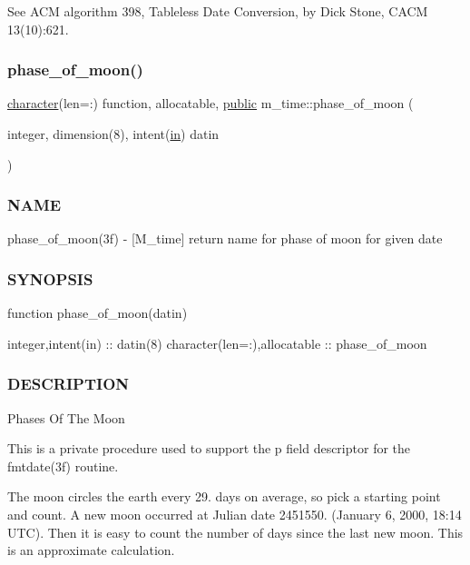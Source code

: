 \begin{DoxyVerb}
See A\+CM algorithm 398, Tableless Date Conversion, by Dick Stone, C\+A\+CM 13(10)\+:621. \mbox{\label{namespacem__time_ab8a976e2f113cc38b6df80974cee55dc}} 
\subsubsection{\texorpdfstring{phase\+\_\+of\+\_\+moon()}{phase\_of\_moon()}}
{\footnotesize\ttfamily \hyperlink{option__stopwatch_83_8txt_abd4b21fbbd175834027b5224bfe97e66}{character}(len=\+:) function, allocatable, \hyperlink{M__stopwatch_83_8txt_a2f74811300c361e53b430611a7d1769f}{public} m\+\_\+time\+::phase\+\_\+of\+\_\+moon (\begin{DoxyParamCaption}\item[{integer, dimension(8), intent(\hyperlink{M__journal_83_8txt_afce72651d1eed785a2132bee863b2f38}{in})}]{datin }\end{DoxyParamCaption})}



\subsubsection*{N\+A\+ME}

phase\+\_\+of\+\_\+moon(3f) -\/ \mbox{[}M\+\_\+time\mbox{]} return name for phase of moon for given date \subsubsection*{S\+Y\+N\+O\+P\+S\+IS}

function phase\+\_\+of\+\_\+moon(datin)

integer,intent(in) \+:\+: datin(8) character(len=\+:),allocatable \+:\+: phase\+\_\+of\+\_\+moon

\subsubsection*{D\+E\+S\+C\+R\+I\+P\+T\+I\+ON}

Phases Of The Moon

This is a private procedure used to support the p field descriptor for the fmtdate(3f) routine.

The moon circles the earth every 29. days on average, so pick a starting point and count. A new moon occurred at Julian date 2451550. (January 6, 2000, 18\+:14 U\+TC). Then it is easy to count the number of days since the last new moon. This is an approximate calculation.


\end{DoxyVerb}
